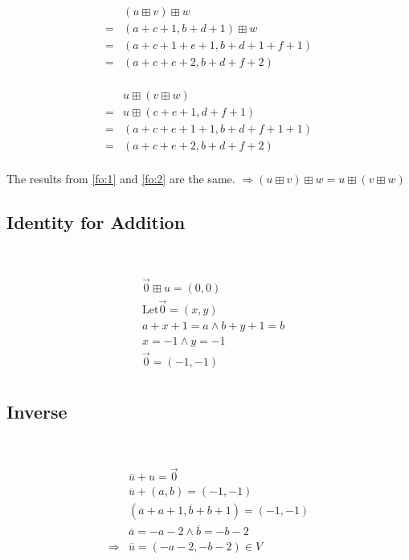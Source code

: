 \documentclass{article}
\begin{document}
~

\begin{equation}
\label{fo:1}
\tag{1.3-1}
\begin{split}
& (u \boxplus v) \boxplus w \\
= & (a+c+1,b+d+1) \boxplus w\\
= & (a+c+1+e+1,b+d+1+f+1)\\
= & (a+c+e+2,b+d+f+2)\\
\end{split}
\end{equation}

\begin{equation}
\label{fo:2}
\tag{1.3-2}
\begin{split}
& u \boxplus (v \boxplus w) \\
= & u \boxplus (c+e+1,d+f+1)\\
= & (a+c+e+1+1,b+d+f+1+1)\\
= & (a+c+e+2,b+d+f+2)\\
\end{split}
\end{equation}

The results from \ref{fo:1} and \ref{fo:2} are the same. $\Rightarrow (u \boxplus v) \boxplus w =u \boxplus (v \boxplus w)$

\subsection{Identity for Addition}

~

\begin{equation}
\label{fo:3}
\tag{1.4}
\begin{split}
& \overrightarrow{0} \boxplus u = (0,0) \\
&\mathrm{Let} \overrightarrow{0} = (x,y)\\
& a+x+1=a \land b+y+1=b\\
& x=-1 \land y=-1\\
&\overrightarrow{0} = (-1,-1)\\
\end{split}
\end{equation}

\subsection{Inverse}

~

\begin{equation}
\tag{1.5}
\begin{split}
& \overline{u}+u=\overrightarrow{0}\\
& \overline{u}+(a,b)= (-1,-1)\\
& (\overline{a} +a+1, \overline{b} +b+1 ) = (-1,-1)\\
& \overline{a} = -a-2 \land \overline{b} =-b-2\\
\Rightarrow & \overline{u} =(-a-2,-b-2) \in V\\
\end{split}
\end{equation}
\end{document}
